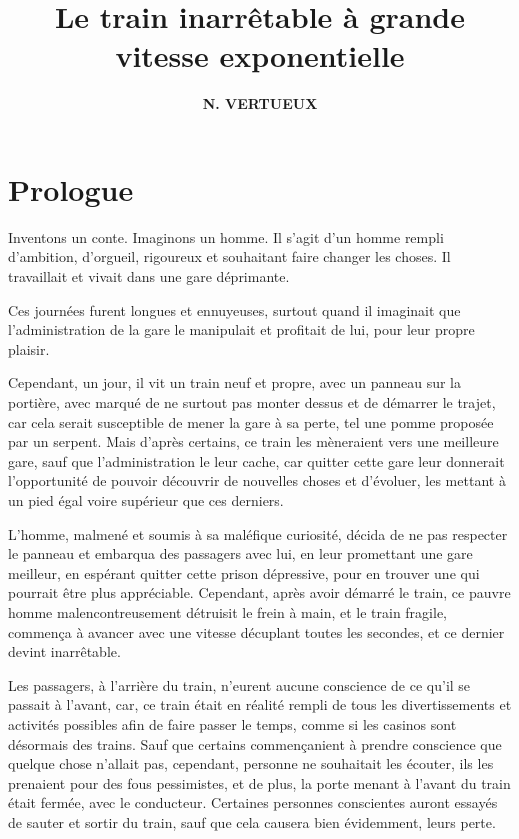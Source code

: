 \documentclass[twocolumn, french]{article}
\author{\large{\textbf{N. VERTUEUX}}}
\title{
  \fontsize{30pt}{36pt}\selectfont \textbf{Le train inarrêtable à grande vitesse exponentielle}
}
\begin{document}
\maketitle
\section*{Prologue} 
Inventons un conte. Imaginons un homme. Il s'agit d'un homme rempli d'ambition, d'orgueil, rigoureux et 
souhaitant faire changer les choses. Il travaillait et vivait dans une gare déprimante. 

Ces journées furent longues et ennuyeuses, surtout quand il imaginait que l'administration de la gare le 
manipulait et profitait de lui, pour leur propre plaisir. 

Cependant, un jour, il vit un train neuf et propre, avec un panneau sur la portière, avec marqué de ne surtout pas 
monter dessus et de démarrer le trajet, car cela serait susceptible de mener la gare à sa perte, tel une pomme 
proposée par un serpent. Mais d'après certains, ce train les mèneraient vers une meilleure gare, sauf que 
l'administration le leur cache, car quitter cette gare leur donnerait l'opportunité de pouvoir découvrir de nouvelles 
choses et d'évoluer, les mettant à un pied égal voire supérieur que ces derniers.   

L'homme, malmené et soumis à sa maléfique curiosité, décida de ne pas respecter le panneau 
et embarqua des passagers avec lui, en leur promettant une gare meilleur, en espérant quitter 
cette prison dépressive, pour en trouver une qui pourrait être plus appréciable. Cependant, après 
avoir démarré le train, ce pauvre homme malencontreusement détruisit le frein à main, et le train fragile, 
commença à avancer avec une vitesse décuplant toutes les secondes, et ce dernier devint inarrêtable. 

Les passagers, à l'arrière du train, n'eurent aucune conscience de ce qu'il se passait à l'avant, car,
ce train était en réalité rempli de tous les divertissements et activités possibles afin de faire passer le temps, 
comme si les casinos sont désormais des trains.
Sauf que certains commençanient à prendre conscience que quelque chose n'allait pas, cependant, personne ne 
souhaitait les écouter, ils les prenaient pour des fous pessimistes, et de plus, la porte menant à l'avant du train 
était fermée, avec le conducteur. Certaines personnes conscientes auront essayés de sauter et sortir du train, sauf 
que cela causera bien évidemment, leurs perte.
\end{document}
